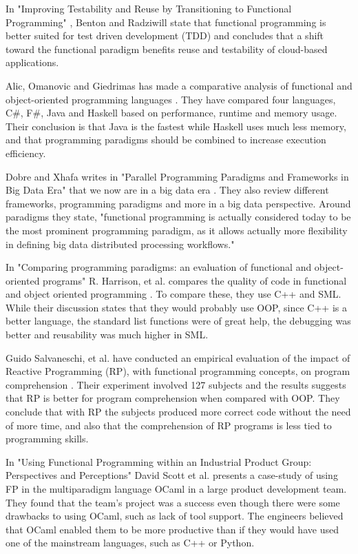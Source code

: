 \documentclass {article}
\begin{document}
In "Improving Testability and Reuse by Transitioning to Functional Programming" \cite{benrad}, Benton and Radziwill state that functional programming is better suited for test driven development (TDD) and concludes that a shift toward the functional paradigm benefits reuse and testability of cloud-based applications.

Alic, Omanovic and Giedrimas has made a comparative analysis of functional and object-oriented programming languages \cite{alomgi}. They have compared four languages, C\#, F\#, Java and Haskell based on performance, runtime and memory usage. Their conclusion is that Java is the fastest while Haskell uses much less memory, and that programming paradigms should be combined to increase execution efficiency. 

Dobre and Xhafa writes in "Parallel Programming Paradigms and Frameworks in Big Data Era" that we now are in a big data era \cite{dobre}. They also review different frameworks, programming paradigms and more in a big data perspective. Around paradigms they state, "functional programming is actually considered today to be the most prominent programming paradigm, as it allows actually more flexibility in defining big data distributed processing workflows."

In "Comparing programming paradigms: an evaluation of functional and object-oriented programs" R. Harrison, et al. compares the quality of code in functional and object oriented programming \cite{hasmadole}. To compare these, they use C++ and SML. While their discussion states that they would probably use OOP, since C++ is a better language, the standard list functions were of great help, the debugging was better and reusability was much higher in SML.

Guido Salvaneschi, et al. have conducted an empirical evaluation of the impact of Reactive Programming (RP), with functional programming concepts, on program comprehension \cite{saproamname}. Their experiment involved 127 subjects and the results suggests that RP is better for program comprehension when compared with OOP. They conclude that with RP the subjects produced more correct code without the need of more time, and also that the comprehension of RP programs is less tied to programming skills. 

In "Using Functional Programming within an Industrial Product Group: Perspectives and Perceptions" \cite{scomad} David Scott et al. presents a case-study of using FP in the multiparadigm language OCaml in a large product development team. They found that the team's project was a success even though there were some drawbacks to using OCaml, such as lack of tool support. The engineers believed that OCaml enabled them to be more productive than if they would have used one of the mainstream languages, such as C++ or Python.
\end{document}
